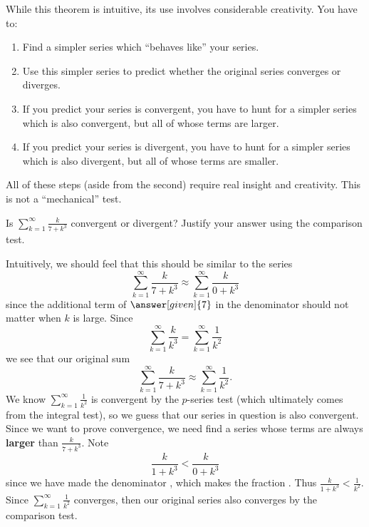 \documentclass{ximera}
\begin{document}
While this theorem is intuitive, its use involves considerable
creativity.  You have to:
\begin{enumerate}
\item Find a simpler series which ``behaves like'' your series.
\item Use this simpler series to predict whether the original series
  converges or diverges.
\item If you predict your series is convergent, you have to hunt for a
  simpler series which is also convergent, but all of whose terms are
  larger.
\item If you predict your series is divergent, you have to hunt for a
  simpler series which is also divergent, but all of whose terms are
  smaller.
\end{enumerate}

All of these steps (aside from the second) require real insight and
creativity.  This is not a ``mechanical'' test.

\begin{example}
Is $\sum_{k=1}^\infty \frac{k}{7+k^3}$ convergent or divergent?
Justify your answer using the comparison test.
\begin{explanation}
  Intuitively, we should feel that this should be similar to the
  series
  \[
  \sum_{k=1}^\infty \frac{k}{7+ k^3} \approx \sum_{k=1}^\infty \frac{k}{0+k^3}
  \]
  since the additional term of $\answer[given]{7}$ in the denominator
  should not matter when $k$ is large. Since
  \[
  \sum_{k=1}^\infty \frac{k}{k^3} =\sum_{k=1}^\infty \frac{1}{k^2}
  \]
  we see that our original sum
  \[
  \sum_{k=1}^\infty \frac{k}{7+ k^3} \approx \sum_{k=1}^\infty \frac{1}{k^2}.
  \]
  We know $\sum_{k=1}^\infty \frac{1}{k^2}$ is convergent by the $p$-series
  test (which ultimately comes from the integral test), so we guess that our 
  series in question is also convergent.  Since we want
  to prove convergence, we need find a series whose terms are always
  \textbf{larger} than $\frac{k}{7+ k^3}$. Note
  \[
  \frac{k}{1+k^3} < \frac{k}{0+k^3}
  \]
  since we have made the denominator
  , which makes
  the fraction .
  Thus $\frac{k}{1+k^3} < \frac{1}{k^2}$.  Since $\sum_{k=1}^\infty
  \frac{1}{k^2}$ converges, then our original series also converges by
  the comparison test.
\end{explanation}
\end{example}
\end{document}
